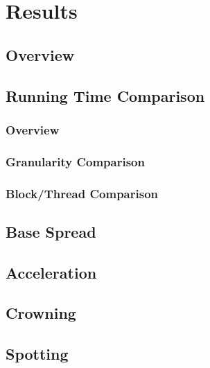 \chapter{Results}
\label{chapter:results}

\section{Overview}

\section{Running Time Comparison}
\subsection{Overview}
\subsection{Granularity Comparison}
\subsection{Block/Thread Comparison}


\section{Base Spread}

\section{Acceleration}

\section{Crowning}

\section{Spotting}